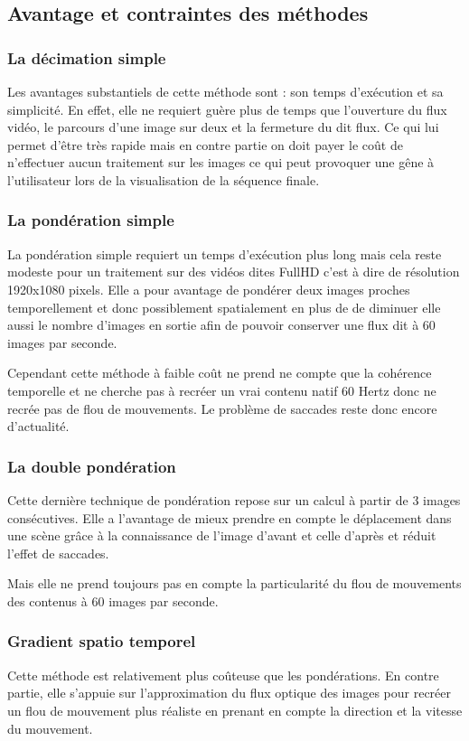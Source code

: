 \documentclass[fleqn,10pt]{SelfArx} %
\begin{document}
\subsection{Avantage et contraintes des méthodes}
\subsubsection{La décimation simple}
Les avantages substantiels de cette méthode sont : son temps d'exécution et sa simplicité. En effet, elle ne requiert guère plus de temps que l'ouverture du flux vidéo, le parcours d'une image sur deux et la fermeture du dit flux. Ce qui lui permet d'être très rapide mais en contre partie on doit payer le coût de n'effectuer aucun traitement sur les images ce qui peut provoquer une gêne à l'utilisateur lors de la visualisation de la séquence finale.

\subsubsection{La pondération simple}
La pondération simple requiert un temps d'exécution plus long mais cela reste modeste pour un traitement sur des vidéos dites \og FullHD \fg{} c'est à dire de résolution 1920x1080 pixels. Elle a pour avantage de pondérer deux images proches temporellement et donc possiblement spatialement en plus de de diminuer elle aussi le nombre d'images en sortie afin de pouvoir conserver une flux dit à 60 images par seconde.

Cependant cette méthode à faible coût ne prend ne compte que la cohérence temporelle et ne cherche pas à recréer un vrai contenu natif 60 Hertz donc ne recrée pas de flou de mouvements. Le problème de saccades reste donc encore d'actualité.

\subsubsection{La double pondération}
Cette dernière technique de pondération repose sur un calcul à partir de 3 images consécutives. Elle a l'avantage de mieux prendre en compte le déplacement dans une scène grâce à la connaissance de l'image d'avant et celle d'après et réduit l'effet de saccades.

Mais elle ne prend toujours pas en compte la particularité du flou de mouvements des contenus à 60 images par seconde.

\subsubsection{Gradient spatio temporel}
Cette méthode est relativement plus coûteuse que les pondérations. En contre partie, elle s'appuie sur
l'approximation du flux optique des images pour recréer un flou de mouvement plus réaliste en prenant en
compte la direction et la vitesse du mouvement.
\end{document}
